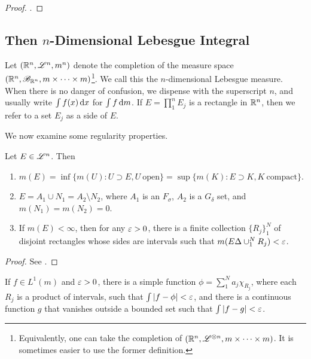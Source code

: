 \documentclass[12pt]{article} %
\begin{document}
\begin{proof}
    \cite[Exercise~49]{folland1999real}.
\end{proof}

\subsection{Then $n$-Dimensional Lebesgue Integral}

\begin{definition}
    Let $(\mathbb{R}^n, \mathscr{L}^n, m^n)$ denote the completion of the measure space $\left(\mathbb{R}^n, \mathscr{B}_{\mathbb{R}^n}, m \times \cdots \times m\right)$\footnote{Equivalently, one can take the completion of $\left(\mathbb{R}^n, \mathscr{L}^{\otimes n}, m \times \cdots \times m\right)$. It is sometimes easier to use the former definition.}. We call this the $n$-dimensional Lebesgue measure. When there is no danger of confusion, we dispense with the superscript $n$, and usually write $\int f(x) \, \mathrm{d} x$ for $\int f \, \mathrm{d} m$. If $E = \prod_1^n E_j$ is a rectangle in $\mathbb{R}^n$, then we refer to a set $E_j$ as a side of $E$.
\end{definition}

We now examine some regularity properties.

\begin{theorem}\label{thm:2.40}
    Let $E \in \mathscr{L}^n$. Then \begin{enumerate}
        \item $m(E) = \inf \{m(U) : U \supset E, U \ \text{open}\} = \sup \{m(K) : E \supset K, K \ \text{compact}\}$.
        \item $E = A_1 \cup N_1 = A_2 \setminus N_2$, where $A_1$ is an $F_\sigma$, $A_2$ is a $G_\delta$ set, and $m(N_1) = m(N_2) = 0$.
        \item If $m(E) < \infty$, then for any $\varepsilon > 0$, there is a finite collection $\{R_j\}_1^N$ of disjoint rectangles whose sides are intervals such that $m(E \Delta \cup_1^N R_j) < \varepsilon$.
    \end{enumerate}
\end{theorem}

\begin{proof}
    See \citet[Theorem~2.40]{folland1999real}.
\end{proof}

\begin{theorem}\label{thm:2.41}
    If $f \in L^1(m)$ and $\varepsilon > 0$, there is a simple function $\phi = \sum_1^N a_j \chi_{R_j}$, where each $R_j$ is a product of intervals, such that $\int |f - \phi| < \varepsilon$, and there is a continuous function $g$ that vanishes outside a bounded set such that $\int |f - g| < \varepsilon$.
\end{theorem}
\end{document}

